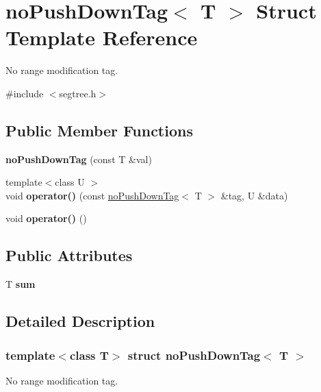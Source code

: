 \hypertarget{structno_push_down_tag}{}\section{no\+Push\+Down\+Tag$<$ T $>$ Struct Template Reference}
\label{structno_push_down_tag}


No range modification tag.  




{\ttfamily \#include $<$segtree.\+h$>$}

\subsection*{Public Member Functions}
\begin{DoxyCompactItemize}
\item 
\mbox{\label{structno_push_down_tag_afbd2aedc7814b6b5e0fa417ca1c1b0fa}} 
{\bfseries no\+Push\+Down\+Tag} (const T \&val)
\item 
\mbox{\label{structno_push_down_tag_a6873e1c0d3d6020d2fdc4c68e8f383eb}} 
{\footnotesize template$<$class U $>$ }\\void {\bfseries operator()} (const \mbox{\hyperlink{structno_push_down_tag}{no\+Push\+Down\+Tag}}$<$ T $>$ \&tag, U \&data)
\item 
\mbox{\label{structno_push_down_tag_ac7294689a34322aa06cb3c065ec11a67}} 
void {\bfseries operator()} ()
\end{DoxyCompactItemize}
\subsection*{Public Attributes}
\begin{DoxyCompactItemize}
\item 
\mbox{\label{structno_push_down_tag_a1b08085f7273582b0b8aa5f48ede1190}} 
T {\bfseries sum}
\end{DoxyCompactItemize}


\subsection{Detailed Description}
\subsubsection*{template$<$class T$>$\newline
struct no\+Push\+Down\+Tag$<$ T $>$}

No range modification tag. 